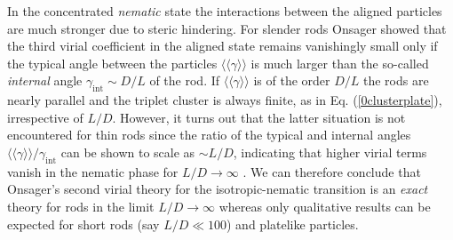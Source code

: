 {In the concentrated {\em nematic} state the interactions between the aligned particles are much
stronger due to steric hindering. For slender rods Onsager showed that the third virial coefficient in the aligned state
remains vanishingly small  only if the typical angle between the particles $\langle\langle \gamma \rangle\rangle $ is much larger than the so-called
{\em internal} angle $\gamma_{\text{int}}\sim D/L$ of the
rod.  If $\langle\langle \gamma \rangle\rangle$ is of the order $D/L$ the rods are nearly parallel
and the triplet cluster is always finite, as in Eq. (\ref{0clusterplate}), irrespective of $L/D$.
However, it turns out that the latter situation is not encountered for thin rods
since the ratio of the typical and internal angles $\langle\langle \gamma \rangle\rangle /\gamma_{\text{int}}$  can be shown to scale as $\sim L/D$, indicating
that higher virial terms vanish in the nematic phase  for $L/D\rightarrow \infty$ \cite{Vroege92}.
We can therefore conclude that  Onsager's  second virial theory for the isotropic-nematic transition
is an {\em exact} theory for rods in the limit $L/D \rightarrow \infty$ whereas  only qualitative results
can be expected for short rods (say $L/D\ll 100$) and  platelike particles.

}
